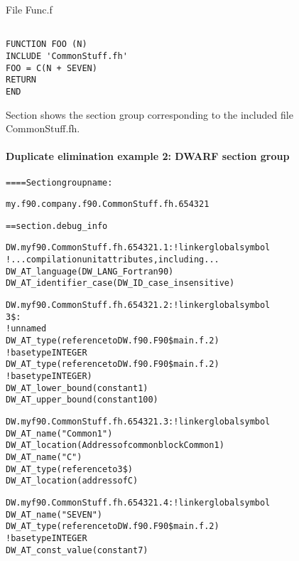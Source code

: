 File Func.f
\begin{lstlisting}

FUNCTION FOO (N)
INCLUDE 'CommonStuff.fh'
FOO = C(N + SEVEN)
RETURN
END
\end{lstlisting}


Section 
shows the section group 
corresponding to the included file CommonStuff.fh.

\paragraph{Duplicate elimination example 2: DWARF section group}
\label{app:duplicateeliminationexample2dwarfsectiongroup}

\begin{alltt}
==== Section group name:

    my.f90.company.f90.CommonStuff.fh.654321

== section .debug\_info

DW.myf90.CommonStuff.fh.654321.1:    ! linker global symbol
        ! ...compilation unit attributes, including...
        DW\-\_AT\-\_language(DW\-\_LANG\-\_Fortran90)
        DW\-\_AT\-\_identifier\-\_case(DW\-\_ID\-\_case\-\_insensitive)

DW.myf90.CommonStuff.fh.654321.2: ! linker global symbol
3\$: 
        ! unnamed
        DW\-\_AT\-\_type(reference to DW.f90.F90\$main.f.2)
            ! base type INTEGER
            DW\-\_AT\-\_type(reference to DW.f90.F90\$main.f.2)
                ! base type INTEGER)
            DW\-\_AT\-\_lower\-\_bound(constant 1)
            DW\-\_AT\-\_upper\-\_bound(constant 100)

DW.myf90.CommonStuff.fh.654321.3: ! linker global symbol
        DW\-\_AT\-\_name("Common1")
        DW\-\_AT\-\_location(Address of common block Common1)
            DW\-\_AT\-\_name("C")
            DW\-\_AT\-\_type(reference to 3\$)
            DW\-\_AT\-\_location(address of C)

DW.myf90.CommonStuff.fh.654321.4: ! linker global symbol
        DW\-\_AT\-\_name("SEVEN")
        DW\-\_AT\-\_type(reference to DW.f90.F90\$main.f.2)
            ! base type INTEGER
        DW\-\_AT\-\_const\-\_value(constant 7)
\end{alltt}

